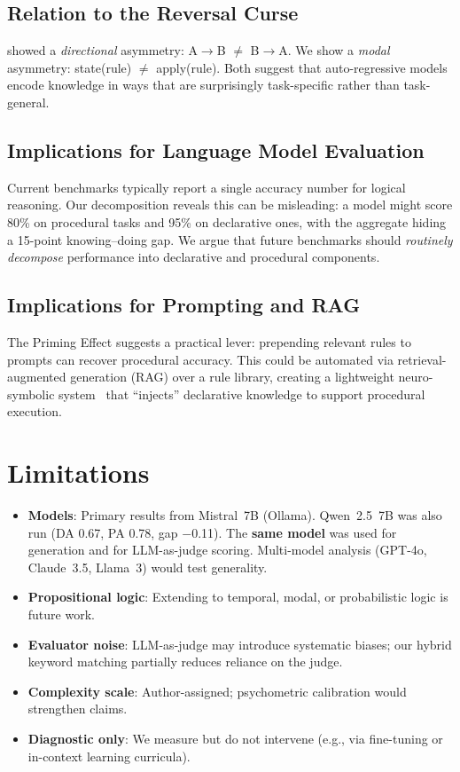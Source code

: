 \documentclass{article}
\begin{document}
\subsection{Relation to the Reversal Curse}

\citet{berglund2024reversal} showed a \emph{directional} asymmetry:
A$\to$B $\neq$ B$\to$A.
We show a \emph{modal} asymmetry: state(rule) $\neq$ apply(rule).
Both suggest that auto-regressive models encode knowledge in ways
that are surprisingly task-specific rather than task-general.

\subsection{Implications for Language Model Evaluation}

Current benchmarks typically report a single accuracy number for
logical reasoning.
Our decomposition reveals this can be misleading: a model might
score 80\% on procedural tasks and 95\% on declarative ones, with
the aggregate hiding a 15-point knowing--doing gap.
We argue that future benchmarks should \emph{routinely decompose}
performance into declarative and procedural components.

\subsection{Implications for Prompting and RAG}

The Priming Effect suggests a practical lever: prepending relevant
rules to prompts can recover procedural accuracy.
This could be automated via retrieval-augmented generation (RAG)
over a rule library, creating a lightweight neuro-symbolic
system~\cite{garcez2023neurosymbolic} that ``injects'' declarative
knowledge to support procedural execution.

\section{Limitations}

\begin{itemize}
    \item \textbf{Models}: Primary results from Mistral~7B (Ollama). Qwen~2.5~7B was also run (DA 0.67, PA 0.78, gap $-$0.11). The \textbf{same model} was used for generation and for LLM-as-judge scoring.
    Multi-model analysis (GPT-4o, Claude~3.5, Llama~3) would test
    generality.
    \item \textbf{Propositional logic}: Extending to temporal,
    modal, or probabilistic logic is future work.
    \item \textbf{Evaluator noise}: LLM-as-judge may introduce
    systematic biases; our hybrid keyword matching partially reduces reliance on the judge.
    \item \textbf{Complexity scale}: Author-assigned; psychometric
    calibration would strengthen claims.
    \item \textbf{Diagnostic only}: We measure but do not intervene
    (e.g., via fine-tuning or in-context learning curricula).
\end{itemize}
\end{document}
